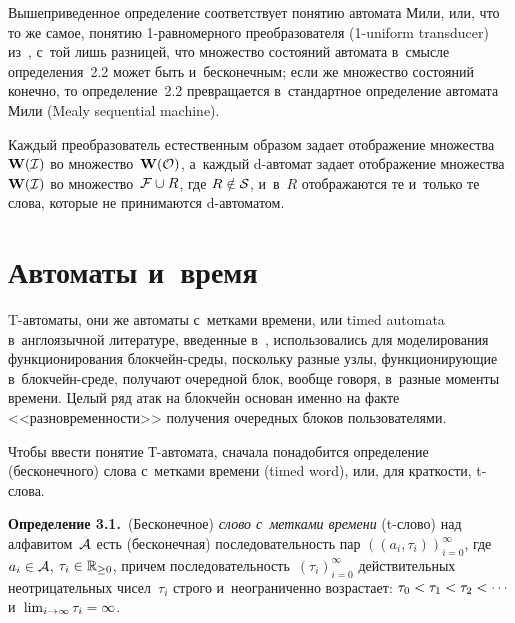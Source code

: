 \begin{multicols}{2}
\smallskip

Вышеприведенное определение соответствует  понятию автомата Мили, или, что
то же самое, понятию 1-равномерного преобразователя (1-uniform transducer)
 из~\cite{Allouche-Shall}, с~той лишь разницей, что множество состояний автомата
 в~смысле определения~2.2 может
быть и~бесконечным; если же множество состояний конечно, то определение~2.2
превращается в~стандартное определение автомата Мили (Mealy sequential machine).

Каждый преобразователь естественным образом задает отображение множества~$\mathbf W(\mathcal I)$
во множество~$\mathbf W(\mathcal O)$, а~каж\-дый d-ав\-то\-мат задает отображение множества
$\mathbf W(\mathcal I)$ во множество~$\mathcal F \cup {R}$, где $R\hm\notin \Cal S$, и~в~$R$
отображаются те и~только те слова,  которые
не принимаются d-ав\-то\-матом.

\vspace*{-9pt}


\section{Автоматы и~время}

\vspace*{-3pt}

T-автоматы, они же автоматы с~метками времени, или
timed automata в~англоязычной литературе, введенные в~\cite{timed-auto},
использовались
для моделирования функционирования блок\-чейн-сре\-ды, поскольку разные узлы, функционирующие
в~блок\-чейн-сре\-де, получают
очередной блок, вообще говоря, в~разные моменты времени.
Целый ряд атак на блокчейн основан именно
на факте <<раз\-но\-вре\-мен\-ности>> получения очередных блоков поль\-зо\-ва\-те\-лями.

Чтобы ввести
понятие Т-ав\-то\-ма\-та,
сначала понадобится определение (бесконечного) слова  с~метками  времени
(timed word), или, для краткости, t-сло\-ва.


\smallskip

\noindent
\textbf{Определение 3.1.}\
(Бесконечное) \textit{слово с~метками времени} (t-сло\-во) над алфавитом~$\mathcal A$ есть
(бесконечная) последовательность пар $((a_i,\tau_i))_{i=0}^\infty$, где $a_i\hm\in\Cal
A$, $\tau_i\hm\in\R_{\ge 0}$, причем последовательность~$(\tau_i)_{i=0}^\infty$ действительных
неотрицательных чисел~$\tau_i$ строго и~неограниченно возрастает: 
$\tau_0\hm<\tau_1\hm<\tau_2<\cdots$
и~$\lim_{i\to\infty}\tau_i\hm=\infty$.


\smallskip


\end{multicols}

